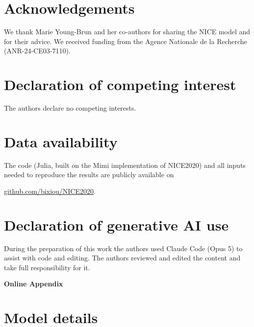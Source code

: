 \documentclass[12pt,english]{article}
\newif\ifblind
\theoremstyle{remark}
\begin{document}
\ifblind\else
\section*{Acknowledgements}
We thank Marie Young-Brun and her co-authors for sharing the NICE model and for their advice. We received funding from the Agence Nationale de la Recherche (ANR-24-CE03-7110). %
\fi

\section*{Declaration of competing interest}
The authors declare no competing interests.

\section*{Data availability}

The code (Julia, built on the Mimi implementation of NICE2020) and all inputs needed to reproduce the results are publicly available on 
\ifblind
[anonymized for review]
\else
\href{https://github.com/bixiou/NICE2020/tree/main/cap_and_share}{github.com/bixiou/NICE2020}.
\fi

\section*{Declaration of generative AI use}
During the preparation of this work the authors used Claude Code (Opus 5) to assist with code and editing. The authors reviewed and edited the content and take full responsibility for it.

\singlespacing
\ifblind
  
\else
  
\fi

\clearpage
\appendix
\nolinenumbers
\setcounter{table}{0}
\renewcommand{\thetable}{A\arabic{table}}
\setcounter{figure}{0}
\renewcommand{\thefigure}{A\arabic{figure}}
\begin{center}\Large\bfseries Online Appendix\end{center}

\section{Model details}
\label{app:model}
\end{document}

